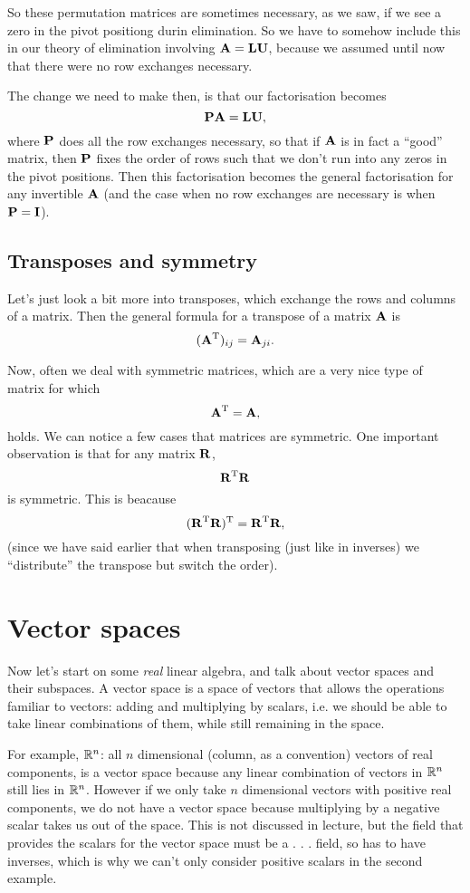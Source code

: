 
So these permutation matrices are sometimes necessary, as we saw, if we see a zero in the pivot positiong durin elimination. So we have to somehow include this in our theory of elimination involving $\boldsymbol{\mathbf{A}} = \boldsymbol{\mathbf{L}}\boldsymbol{\mathbf{U}}$, because we assumed until now that there were no row exchanges necessary. 

The change we need to make then, is that our factorisation becomes
\[ \boldsymbol{\mathbf{P}}\boldsymbol{\mathbf{A}} = \boldsymbol{\mathbf{L}}\boldsymbol{\mathbf{U}}, \]
where $\boldsymbol{\mathbf{P}}$ does all the row exchanges necessary, so that if $\boldsymbol{\mathbf{A}}$ is in fact a ``good'' matrix, then $\boldsymbol{\mathbf{P}}$ fixes the order of rows such that we don't run into any zeros in the pivot positions. Then this factorisation becomes the general factorisation for any invertible $\boldsymbol{\mathbf{A}}$ (and the case when no row exchanges are necessary is when $\boldsymbol{\mathbf{P}} = \boldsymbol{\mathbf{I}}$). 

\subsection{Transposes and symmetry}

Let's just look a bit more into transposes, which exchange the rows and columns of a matrix. Then the general formula for a transpose of a matrix $\boldsymbol{\mathbf{A}}$ is
\[ (\boldsymbol{\mathbf{A}}^\mathrm{T})_{ij} = \boldsymbol{\mathbf{A}}_{ji}. \]

Now, often we deal with symmetric matrices, which are a very nice type of matrix for which
\[ \boldsymbol{\mathbf{A}}^\mathrm{T} = \boldsymbol{\mathbf{A}}, \]
holds. We can notice a few cases that matrices are symmetric. One important observation is that for any matrix $\boldsymbol{\mathbf{R}}$,
\[ \boldsymbol{\mathbf{R}}^\mathrm{T}\boldsymbol{\mathbf{R}} \]
is symmetric. This is beacause
\[ (\boldsymbol{\mathbf{R}}^\mathrm{T}\boldsymbol{\mathbf{R}})^\mathrm{T} = \boldsymbol{\mathbf{R}}^\mathrm{T} \boldsymbol{\mathbf{R}}, \]
(since we have said earlier that when transposing (just like in inverses) we ``distribute'' the transpose but switch the order). 

\section{Vector spaces}

Now let's start on some \textit{real} linear algebra, and talk about vector spaces and their subspaces. A vector space is a space of vectors that allows the operations familiar to vectors: adding and multiplying by scalars, i.e. we should be able to take linear combinations of them, while still remaining in the space. 

For example, $\mathbb{R}^n$: all $n$ dimensional (column, as a convention) vectors of real components, is a vector space because any linear combination of vectors in $\mathbb{R}^n$ still lies in $\mathbb{R}^n$. However if we only take $n$ dimensional vectors with positive real components, we do not have a vector space because multiplying by a negative scalar takes us out of the space. 
\brm
This is not discussed in lecture, but the field that provides the scalars for the vector space must be a . . . field, so has to have inverses, which is why we can't only consider positive scalars in the second example.
\erm

